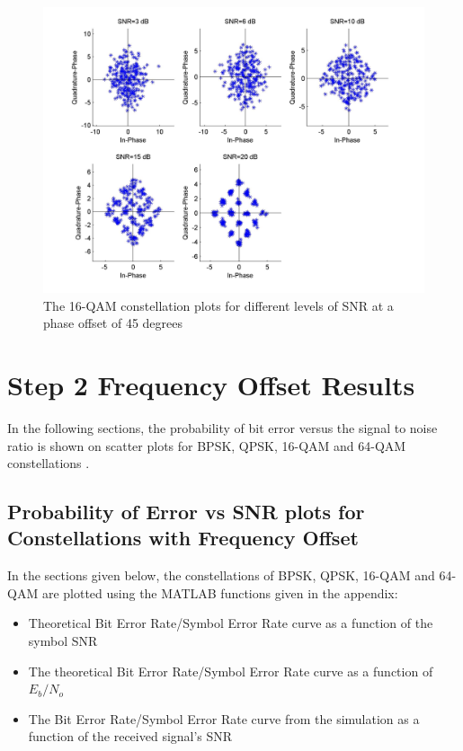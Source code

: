 \documentclass[]{article}
\begin{document}
\begin{figure}[H]
\centering
\hspace*{-2cm}\includegraphics[width=1.3\textwidth]{qam16Constpo4.jpg}
\caption{The 16-QAM constellation plots for different levels of SNR at a phase offset of 45 degrees}
\end{figure}

\section{Step 2 Frequency Offset Results}
\label{sec:results_fo}
In the following sections, the probability of bit error versus the signal to noise ratio is shown on scatter plots for BPSK, QPSK, 16-QAM and 64-QAM constellations .

\subsection{Probability of Error vs SNR plots for Constellations with Frequency Offset}
In the sections given below, the constellations of BPSK, QPSK, 16-QAM and 64-QAM are plotted using the MATLAB functions given in the appendix:
\begin{itemize}
\item Theoretical Bit Error Rate/Symbol Error Rate curve as a function of the symbol SNR
\item The theoretical Bit Error Rate/Symbol Error Rate curve as a function of $E_b/N_o$
\item The Bit Error Rate/Symbol Error Rate curve from the simulation as a function of the received signal's SNR
\end{itemize}
\end{document}
